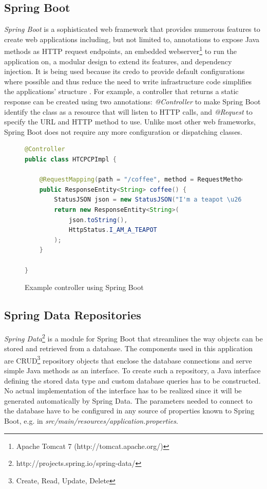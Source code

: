 \newpage

\subsection{Spring Boot}
\textit{Spring Boot} is a sophisticated web framework that provides numerous features to create web applications including, but not limited to, annotations to expose Java methods as HTTP request endpoints, an embedded webserver\footnote{Apache Tomcat 7 (http://tomcat.apache.org/)} to run the application on, a modular design to extend its features, and dependency injection. It is being used because its credo to provide default configurations where possible and thus reduce the need to write infrastructure code simplifies the applications' structure \cite[p. 6]{SpringGuide}.
For example, a controller that returns a static response can be created using two annotations:
\textit{@Controller} to make Spring Boot identify the class as a resource that will listen to HTTP calls, and \textit{@Request} to specify the URL and HTTP method to use. Unlike most other web frameworks, Spring Boot does not require any more configuration or dispatching classes.

\begin{figure}[h]
\begin{lstlisting}[language=Java]
@Controller
public class HTCPCPImpl {

	@RequestMapping(path = "/coffee", method = RequestMethod.GET)
	public ResponseEntity<String> coffee() {
		StatusJSON json = new StatusJSON("I'm a teapot \u2615");
		return new ResponseEntity<String>(
			json.toString(),
			HttpStatus.I_AM_A_TEAPOT
		);
	}

}
\end{lstlisting}
\caption[Code: Example Controller]{Example controller using Spring Boot}
\end{figure}

\newpage


\subsection{Spring Data Repositories}
\textit{Spring Data}\footnote{http://projects.spring.io/spring-data/} is a module for Spring Boot that streamlines the way objects can be stored and retrieved from a database. The components used in this application are CRUD\footnote{Create, Read, Update, Delete} repository objects that enclose the database connections and serve simple Java methods as an interface. To create such a repository, a Java interface defining the stored data type and custom database queries has to be constructed.
No actual implementation of the interface has to be realized since it will be generated automatically by Spring Data.
The parameters needed to connect to the database have to be configured in any source of properties known to Spring Boot, e.g. in \textit{src/main/resources/application.properties}.

